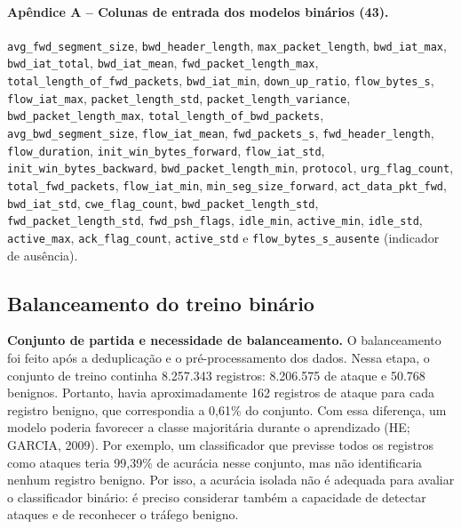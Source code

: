 \documentclass[
    12pt,                %
    openright,           %
    oneside,             %
    a4paper,             %
    english,             %
    brazil               %
]{abntex2}
\begin{document}
\paragraph{Apêndice A -- Colunas de entrada dos modelos binários (43).}

\texttt{avg\_fwd\_segment\_size}, \texttt{bwd\_header\_length}, \texttt{max\_packet\_length}, \texttt{bwd\_iat\_max}, \texttt{bwd\_iat\_total}, \texttt{bwd\_iat\_mean}, \texttt{fwd\_packet\_length\_max}, \texttt{total\_length\_of\_fwd\_packets}, \texttt{bwd\_iat\_min}, \texttt{down\_up\_ratio}, \texttt{flow\_bytes\_s}, \texttt{flow\_iat\_max}, \texttt{packet\_length\_std}, \texttt{packet\_length\_variance}, \texttt{bwd\_packet\_length\_max}, \texttt{total\_length\_of\_bwd\_packets}, \texttt{avg\_bwd\_segment\_size}, \texttt{flow\_iat\_mean}, \texttt{fwd\_packets\_s}, \texttt{fwd\_header\_length}, \texttt{flow\_duration}, \texttt{init\_win\_bytes\_forward}, \texttt{flow\_iat\_std}, \texttt{init\_win\_bytes\_backward}, \texttt{bwd\_packet\_length\_min}, \texttt{protocol}, \texttt{urg\_flag\_count}, \texttt{total\_fwd\_packets}, \texttt{flow\_iat\_min}, \texttt{min\_seg\_size\_forward}, \texttt{act\_data\_pkt\_fwd}, \texttt{bwd\_iat\_std}, \texttt{cwe\_flag\_count}, \texttt{bwd\_packet\_length\_std}, \texttt{fwd\_packet\_length\_std}, \texttt{fwd\_psh\_flags}, \texttt{idle\_min}, \texttt{active\_min}, \texttt{idle\_std}, \texttt{active\_max}, \texttt{ack\_flag\_count}, \texttt{active\_std} e \texttt{flow\_bytes\_s\_ausente} (indicador de ausência).


\subsection{Balanceamento do treino binário}

\textbf{Conjunto de partida e necessidade de balanceamento.} O balanceamento foi feito após a deduplicação e o pré-processamento dos dados. Nessa etapa, o conjunto de treino continha 8.257.343 registros: 8.206.575 de ataque e 50.768 benignos. Portanto, havia aproximadamente 162 registros de ataque para cada registro benigno, que correspondia a 0,61\% do conjunto. Com essa diferença, um modelo poderia favorecer a classe majoritária durante o aprendizado (HE; GARCIA, 2009). Por exemplo, um classificador que previsse todos os registros como ataques teria 99,39\% de acurácia nesse conjunto, mas não identificaria nenhum registro benigno. Por isso, a acurácia isolada não é adequada para avaliar o classificador binário: é preciso considerar também a capacidade de detectar ataques e de reconhecer o tráfego benigno.
\end{document}
